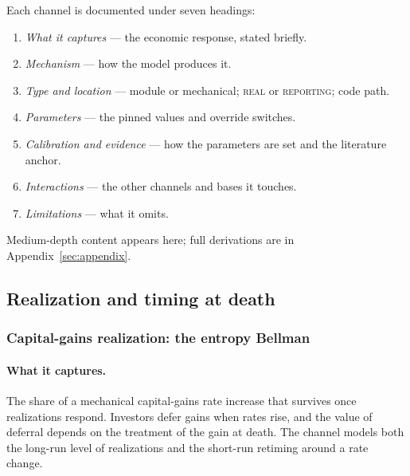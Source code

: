 \documentclass[11pt]{article}
\newcommand{\field}[1]{\paragraph{#1.}}
\begin{document}
Each channel is documented under seven headings:
\begin{enumerate}[leftmargin=1.6em,itemsep=0.1em]
\item \emph{What it captures} --- the economic response, stated briefly.
\item \emph{Mechanism} --- how the model produces it.
\item \emph{Type and location} --- module or mechanical; \textsc{real} or
\textsc{reporting}; code path.
\item \emph{Parameters} --- the pinned values and override switches.
\item \emph{Calibration and evidence} --- how the parameters are set and the
literature anchor.
\item \emph{Interactions} --- the other channels and bases it touches.
\item \emph{Limitations} --- what it omits.
\end{enumerate}
Medium-depth content appears here; full derivations are in
Appendix~\ref{sec:appendix}.

\subsection{Realization and timing at death}

\subsubsection{Capital-gains realization: the entropy Bellman}
\label{sec:realization}

\field{What it captures}
The share of a mechanical capital-gains rate increase that survives once
realizations respond. Investors defer gains when rates rise, and the value of
deferral depends on the treatment of the gain at death. The channel models both
the long-run level of realizations and the short-run retiming around a rate
change.
\end{document}
